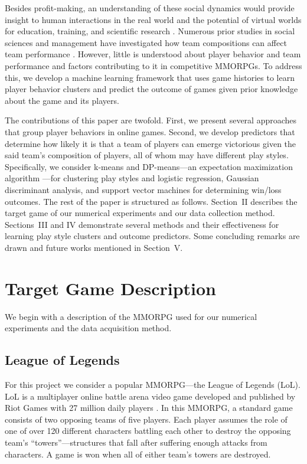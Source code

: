 \documentclass[letterpaper,10 pt,conference]{ieeeconf}
\begin{document}
Besides profit-making, an understanding of these social dynamics would provide insight to human interactions in the real world and the potential of virtual worlds for education, training, and scientific research \cite{Bai:12,Dic:05}. Numerous prior studies in social sciences and management have investigated how team compositions can affect team performance \cite{Spo:11,HA:08}. However, little is understood about player behavior and team performance and factors contributing to it in competitive MMORPGs. To address this, we develop a machine learning framework that uses game histories to learn player behavior clusters and predict the outcome of games given prior knowledge about the game and its players. 

The contributions of this paper are twofold. First, we present several approaches that group player behaviors in online games. Second, we develop predictors that determine how likely it is that a team of players can emerge victorious given the said team's composition of players, all of whom may have different play styles. Specifically, we consider k-means and DP-means---an expectation maximization algorithm \cite{KJ:12}---for clustering play styles and logistic regression, Gaussian discriminant analysis, and support vector machines for determining win/loss outcomes. The rest of the paper is structured as follows. Section~II describes the target game of our numerical experiments and our data collection method. Sections~III and IV demonstrate several methods and their effectiveness for learning play style clusters and outcome predictors. Some concluding remarks are drawn and future works mentioned in Section~V.

\section{Target Game Description}

We begin with a description of the MMORPG used for our numerical experiments and the data acquisition method.

\subsection{League of Legends}

For this project we consider a popular MMORPG---the League of Legends (LoL). LoL is a multiplayer online battle arena video game developed and published by Riot Games with 27 million daily players \cite{Tas:14}. In this MMORPG, a standard game consists of two opposing teams of five players. Each player assumes the role of one of over 120 different characters battling each other to destroy the opposing team's ``towers''---structures that fall after suffering enough attacks from characters. A game is won when all of either team's towers are destroyed. 
\end{document}

